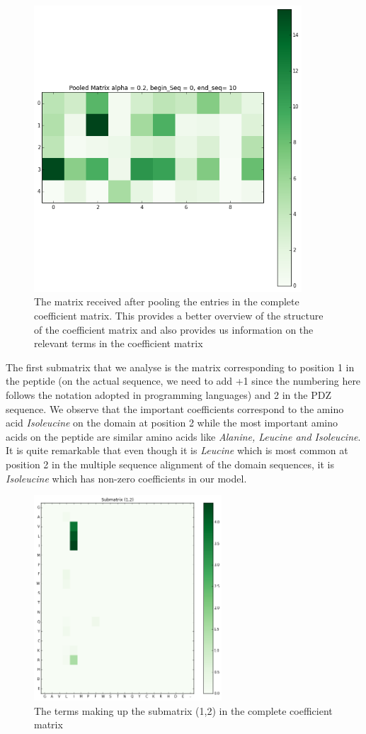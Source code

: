 \documentclass[a4paper, 12pt]{article}
\begin{document}
\begin{enumerate}
\begin{figure}[!h]
\centering 
\label{pooled_matrix}
\includegraphics[width=10cm]{Images/pooled_matrix_seq_10.png}
\caption{The matrix received after pooling the entries in the complete coefficient matrix. This provides a better overview of the structure of the coefficient matrix and also provides us information on the relevant terms in the coefficient matrix}
\end{figure} 

The first submatrix that we analyse is the matrix corresponding to position 1 in the peptide (on the actual sequence, we need to add +1 since the numbering here follows the notation adopted in programming languages) and 2 in the PDZ sequence. We observe that the important coefficients correspond to the amino acid \emph{Isoleucine} on the domain at position 2 while the most important amino acids on the peptide are similar amino acids like \emph{Alanine, Leucine and Isoleucine}. It is quite remarkable that even though it is \emph{Leucine} which is most common at position 2 in the multiple sequence alignment of the domain sequences, it is \emph{Isoleucine} which has non-zero coefficients in our model. 

\begin{figure}[!h]
\centering
\label{submatrix_12}
\includegraphics[width=7cm]{Images/submatrix_12.png}
\caption{The terms making up the submatrix (1,2) in the complete coefficient matrix}
\end{figure}


\end{enumerate}
\end{document}
